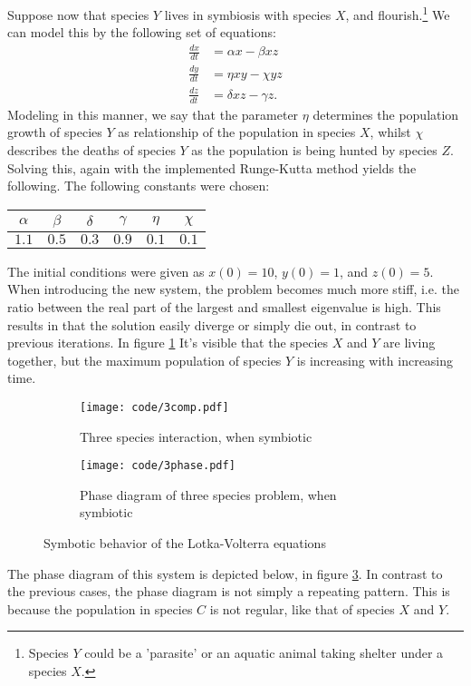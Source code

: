 \documentclass[a4paper]{article}
\newcommand{\newparagraph}{\vspace{.5cm}\noindent}
\begin{document}
\newparagraph
Suppose now that species $Y$ lives in symbiosis with species $X$, and flourish.\footnote{Species $Y$ could be a 'parasite' or an aquatic animal taking shelter under a species $X$.} We can model this by the following set of equations:
\begin{align}
    \frac{dx}{dt} &= \alpha x - \beta xz \nonumber\\
    \frac{dy}{dt} &= \eta x y - \chi y z \nonumber\\
    \frac{dz}{dt} &= \delta xz - \gamma z.\label{eq: mod-eq}
\end{align}
Modeling in this manner, we say that the parameter $\eta$ determines the population growth of species $Y$ as relationship of the population in species $X$, whilst $\chi$ describes the deaths of species $Y$ as the population is being hunted by species $Z$. Solving this, again with the implemented Runge-Kutta method yields the following. The following constants were chosen:
\begin{table}[H]
    \centering
    \begin{tabular}{|c|c|c|c|c|c|}\hline
    $\alpha$ & $\beta$ & $\delta$ & $\gamma$ & $\eta$ & $\chi$\\\hline
    $1.1$ & $0.5$ & $0.3$ & $0.9$ & $0.1$ & $0.1$\\\hline
    \end{tabular}
\end{table}\noindent
The initial conditions were given as $x(0) = 10$, $y(0) = 1$, and $z(0) = 5$. When introducing the new system, the problem becomes much more stiff, i.e. the ratio between the real part of the largest and smallest eigenvalue is high. This results in that the solution easily diverge or simply die out, in contrast to previous iterations. In figure \ref{fig: 3 species interaction pop} It's visible that the species $X$ and $Y$ are living together, but the maximum population of species $Y$ is increasing with increasing time.
\begin{figure}[H]
    \centering
    \begin{subfigure}{0.45\textwidth}
        \texttt{[image: code/3comp.pdf]}
        \caption{Three species interaction, when symbiotic}
        \label{fig: 3 species interaction pop}
    \end{subfigure}
    \hfill
    \begin{subfigure}{0.45\textwidth}
        \texttt{[image: code/3phase.pdf]}
        \caption{Phase diagram of three species problem, when symbiotic}
        \label{fig: 3phase}
    \end{subfigure}
    \caption{Symbotic behavior of the Lotka-Volterra equations}
\end{figure}\noindent
The phase diagram of this system is depicted below, in figure \ref{fig: 3phase}. In contrast to the previous cases, the phase diagram is not simply a repeating pattern. This is because the population in species $C$ is not regular, like that of species $X$ and $Y$.
\end{document}
